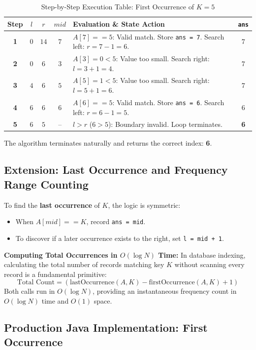 \documentclass[10pt,journal,compsoc,onecolumn]{IEEEtran}
\begin{document}
\begin{table}[h]
\centering
\caption{Step-by-Step Execution Table: First Occurrence of $K = 5$}
\label{tab:first_occurrence_trace}
\begin{tabular}{@{}cccclc@{}}
\toprule
\textbf{Step} & $l$ & $r$ & $mid$ & \textbf{Evaluation \& State Action} & \texttt{ans} \\ \midrule
\textbf{1} & $0$ & $14$ & $7$ & $A[7] == 5$: Valid match. Store \texttt{ans = 7}. Search left: $r = 7 - 1 = 6$. & $7$ \\
\textbf{2} & $0$ & $6$ & $3$ & $A[3] = 0 < 5$: Value too small. Search right: $l = 3 + 1 = 4$. & $7$ \\
\textbf{3} & $4$ & $6$ & $5$ & $A[5] = 1 < 5$: Value too small. Search right: $l = 5 + 1 = 6$. & $7$ \\
\textbf{4} & $6$ & $6$ & $6$ & $A[6] == 5$: Valid match. Store \texttt{ans = 6}. Search left: $r = 6 - 1 = 5$. & $6$ \\
\textbf{5} & $6$ & $5$ & -- & $l > r$ ($6 > 5$): Boundary invalid. Loop terminates. & \textbf{6} \\ \bottomrule
\end{tabular}
\end{table}

The algorithm terminates naturally and returns the correct index: \textbf{6}.

\subsection{Extension: Last Occurrence and Frequency Range Counting}

To find the \textbf{last occurrence} of $K$, the logic is symmetric:
\begin{itemize}
    \item When $A[mid] == K$, record \texttt{ans = mid}.
    \item To discover if a later occurrence exists to the right, set \texttt{l = mid + 1}.
\end{itemize}

\textbf{Computing Total Occurrences in $O(\log N)$ Time:}
In database indexing, calculating the total number of records matching key $K$ without scanning every record is a fundamental primitive:
\[
\text{Total Count} = (\text{lastOccurrence}(A, K) - \text{firstOccurrence}(A, K) + 1)
\]
Both calls run in $O(\log N)$, providing an instantaneous frequency count in $O(\log N)$ time and $O(1)$ space.

\subsection{Production Java Implementation: First Occurrence}
\end{document}

